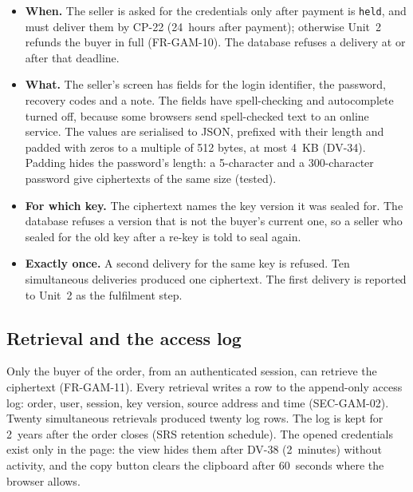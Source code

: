 \documentclass[11pt,a4paper]{article}
\begin{document}
\begin{itemize}[nosep]
  \item \textbf{When.} The seller is asked for the credentials only after payment is \texttt{held}, and must deliver them by CP-22 (24~hours after payment); otherwise Unit~2 refunds the buyer in full (FR-GAM-10). The database refuses a delivery at or after that deadline.
  \item \textbf{What.} The seller's screen has fields for the login identifier, the password, recovery codes and a note. The fields have spell-checking and autocomplete turned off, because some browsers send spell-checked text to an online service. The values are serialised to JSON, prefixed with their length and padded with zeros to a multiple of 512 bytes, at most 4~KB (DV-34). Padding hides the password's length: a 5-character and a 300-character password give ciphertexts of the same size (tested).
  \item \textbf{For which key.} The ciphertext names the key version it was sealed for. The database refuses a version that is not the buyer's current one, so a seller who sealed for the old key after a re-key is told to seal again.
  \item \textbf{Exactly once.} A second delivery for the same key is refused. Ten simultaneous deliveries produced one ciphertext. The first delivery is reported to Unit~2 as the fulfilment step.
\end{itemize}

\subsection{Retrieval and the access log}
Only the buyer of the order, from an authenticated session, can retrieve the ciphertext (FR-GAM-11). Every retrieval writes a row to the append-only access log: order, user, session, key version, source address and time (SEC-GAM-02). Twenty simultaneous retrievals produced twenty log rows. The log is kept for 2~years after the order closes (SRS retention schedule). The opened credentials exist only in the page: the view hides them after DV-38 (2~minutes) without activity, and the copy button clears the clipboard after 60~seconds where the browser allows.
\end{document}
